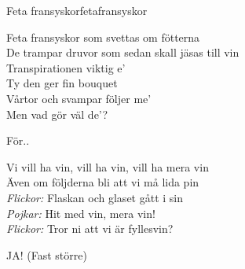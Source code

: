\begin{song}{Feta fransyskor}{fetafransyskor}
\begin{vers}
Feta fransyskor som svettas om fötterna\\
De trampar druvor som sedan skall jäsas till vin\\
Transpirationen viktig e'\\
Ty den ger fin bouquet\\
Vårtor och svampar följer me'\\
Men vad gör väl de'?\\
\end{vers}
\begin{vers}
För..\\
\end{vers}
\begin{vers}
Vi vill ha vin, vill ha vin, vill ha mera vin\\
Även om följderna bli att vi må lida pin\\
\textit{Flickor:}   Flaskan och glaset gått i sin\\
\textit{Pojkar:}    Hit med vin, mera vin!\\
\textit{Flickor:}   Tror ni att vi är fyllesvin?\\
\end{vers}
\begin{vers}
JA! (Fast större)\\
\end{vers}
\end{song}
